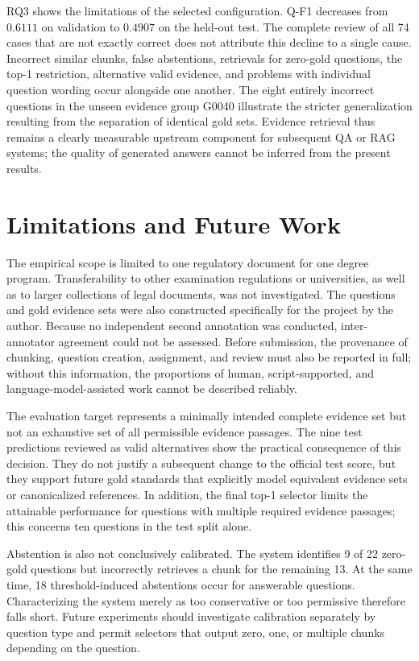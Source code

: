 \documentclass[11pt]{article}
\begin{document}
RQ3 shows the limitations of the selected configuration. Q-F1 decreases from $0.6111$ on validation to $0.4907$ on the held-out test. The complete review of all 74 cases that are not exactly correct does not attribute this decline to a single cause. Incorrect similar chunks, false abstentions, retrievals for zero-gold questions, the top-1 restriction, alternative valid evidence, and problems with individual question wording occur alongside one another. The eight entirely incorrect questions in the unseen evidence group G0040 illustrate the stricter generalization resulting from the separation of identical gold sets. Evidence retrieval thus remains a clearly measurable upstream component for subsequent QA or RAG systems; the quality of generated answers cannot be inferred from the present results.


\section{Limitations and Future Work}

The empirical scope is limited to one regulatory document for one degree program. Transferability to other examination regulations or universities, as well as to larger collections of legal documents, was not investigated. The questions and gold evidence sets were also constructed specifically for the project by the author. Because no independent second annotation was conducted, inter-annotator agreement could not be assessed. Before submission, the provenance of chunking, question creation, assignment, and review must also be reported in full; without this information, the proportions of human, script-supported, and language-model-assisted work cannot be described reliably.

The evaluation target represents a minimally intended complete evidence set but not an exhaustive set of all permissible evidence passages. The nine test predictions reviewed as valid alternatives show the practical consequence of this decision. They do not justify a subsequent change to the official test score, but they support future gold standards that explicitly model equivalent evidence sets or canonicalized references. In addition, the final top-1 selector limits the attainable performance for questions with multiple required evidence passages; this concerns ten questions in the test split alone.

Abstention is also not conclusively calibrated. The system identifies 9 of 22 zero-gold questions but incorrectly retrieves a chunk for the remaining 13. At the same time, 18 threshold-induced abstentions occur for answerable questions. Characterizing the system merely as too conservative or too permissive therefore falls short. Future experiments should investigate calibration separately by question type and permit selectors that output zero, one, or multiple chunks depending on the question.
\end{document}
